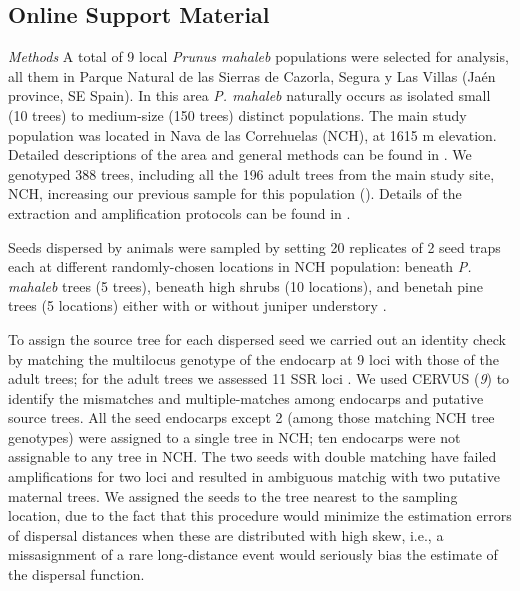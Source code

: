 \documentclass[a4paper,12pt]{article}
\begin{document}
\newpage
\begin{bibunit}[science]
\section*{Online Support Material}
\begin{spacing}{2.0}
\textit{Methods}
A total of 9 local \textit{Prunus mahaleb} populations were selected  for analysis, all them in Parque Natural de las Sierras de Cazorla,  Segura y Las Villas (Ja\'{e}n province, SE Spain). In this area \textit{P.  mahaleb} naturally occurs as isolated small (10 trees) to medium-size  (150 trees) distinct populations. The main study population was  located in Nava de las Correhuelas (NCH), at 1615 m elevation. Detailed  descriptions of the area and general methods can be found in  \citep{Jordano:1994,Jordano:1995,Jordano:2000EcolMon,Jordano:2002}. We genotyped 388 trees, including all the 196 adult  trees from the main study site, NCH, increasing our previous  sample for this population (\citep{Godoy:2001}). Details of the extraction  and amplification protocols can be found in \citep{Godoy:2001,Jordano:2002}.

Seeds dispersed by animals were sampled by setting 20 replicates  of 2 seed traps each at different randomly-chosen locations in NCH population: beneath \textit{P.  mahaleb} trees (5 trees), beneath high shrubs (10 locations),  and benetah pine trees (5 locations) either with or without juniper  understory \citep{Godoy:2001,Jordano:2002}.

To assign the source tree for each dispersed seed we carried  out an identity check by matching the multilocus genotype of  the endocarp at 9 loci with those of the adult trees; for the  adult trees we assessed 11 SSR loci \citep{Cipriani:1999,Sosinski:2000}. We used CERVUS (\textit{9}) to identify the mismatches and multiple-matches among  endocarps and putative source trees. All the seed endocarps except  2 (among those matching NCH tree genotypes) were assigned to  a single tree in NCH; ten endocarps were not assignable to any  tree in NCH. The two seeds with double matching have failed amplifications  for two loci and resulted in ambiguous matchig with two putative  maternal trees. We assigned the seeds to the tree nearest to  the sampling location, due to the fact that this procedure would  minimize the estimation errors of dispersal distances when these  are distributed with high skew, i.e., a missasignment of a rare long-distance event would seriously bias the estimate of the dispersal function.


\end{spacing}
\end{bibunit}
\end{document}

